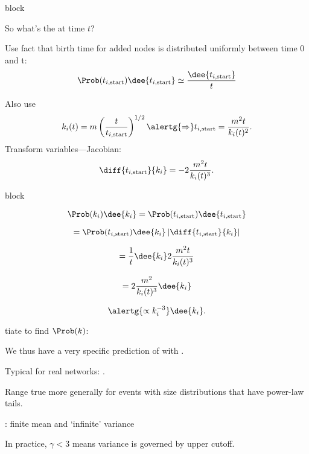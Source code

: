   

{block}{}
 
  
   So what's the  at time $t$?
  
   Use fact that birth time for added nodes
   is distributed uniformly between time 0 and t:
   $$
   \Prob(t_{i,\textrm{start}}) \dee{t_{i,\textrm{start}}}
   \simeq
   \frac{\dee{t_{i,\textrm{start}}}}
   {t}
   $$
 
   Also use
   $$
   k_i(t) 
   = 
   m 
   \left(
   \frac{t}{t_{i,\textrm{start}}}
   \right)^{1/2}
   \alertg{\Rightarrow}
   t_{i,\textrm{start}}
   = \frac{m^2 t}{k_i(t)^2}.
   $$
   {
     Transform variables---Jacobian:
     $$
     \diff{t_{i,\textrm{start}}}{k_i}  = -2 \frac{m^2 t}{k_i(t)^3}.
     $$
   }
 
 

{block}{}
  
   
    $$
    \Prob(k_i) \dee{k_i} =  \Prob(t_{i,\textrm{start}}) \dee{t_{i,\textrm{start}}}
    $$
   
    $$
    = \Prob(t_{i,\textrm{start}}) \dee{k_i} \left| \diff{t_{i,\textrm{start}}}{k_i} \right|
    $$
   
    $$
    = \frac{1}{t} \dee{k_i} 2 \frac{m^2 t}{k_i(t)^3}
    $$
   
    $$
    = 2 \frac{m^2 }{k_i(t)^3}  \dee{k_i}
    $$
   
    $$
    \alertg{\propto k_i^{-3}} \dee{k_i}.
    $$
  
  

tiate to find $\Prob(k)$:
 
   
    We thus have a very specific prediction of 
     with .
   
    Typical for real networks: .
   
    Range true more generally for events with size
    distributions that have power-law tails.
  
    : finite mean and `infinite' variance
    {}
  
    In practice, $\gamma < 3$ means variance is governed
    by upper cutoff.
  
